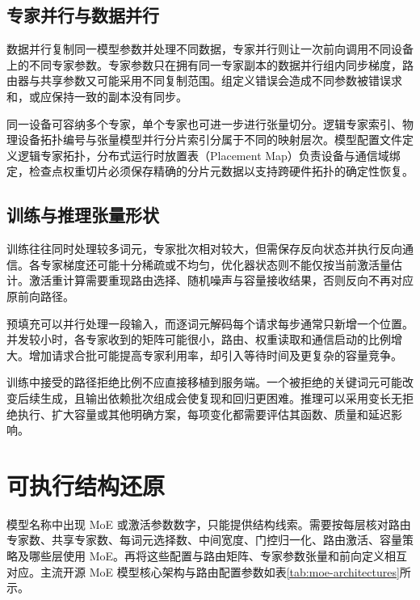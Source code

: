 \documentclass[../textbook.tex]{subfiles}
\begin{document}
\subsection{专家并行与数据并行}
数据并行复制同一模型参数并处理不同数据，专家并行则让一次前向调用不同设备上的不同专家参数。专家参数只在拥有同一专家副本的数据并行组内同步梯度，路由器与共享参数又可能采用不同复制范围。组定义错误会造成不同参数被错误求和，或应保持一致的副本没有同步。

同一设备可容纳多个专家，单个专家也可进一步进行张量切分。逻辑专家索引、物理设备拓扑编号与张量模型并行分片索引分属于不同的映射层次。模型配置文件定义逻辑专家拓扑，分布式运行时放置表（Placement Map）负责设备与通信域绑定，检查点权重切片必须保存精确的分片元数据以支持跨硬件拓扑的确定性恢复。

\subsection{训练与推理张量形状}
训练往往同时处理较多词元，专家批次相对较大，但需保存反向状态并执行反向通信。各专家梯度还可能十分稀疏或不均匀，优化器状态则不能仅按当前激活量估计。激活重计算需要重现路由选择、随机噪声与容量接收结果，否则反向不再对应原前向路径。

预填充可以并行处理一段输入，而逐词元解码每个请求每步通常只新增一个位置。并发较小时，各专家收到的矩阵可能很小，路由、权重读取和通信启动的比例增大。增加请求合批可能提高专家利用率，却引入等待时间及更复杂的容量竞争。

训练中接受的路径拒绝比例不应直接移植到服务端。一个被拒绝的关键词元可能改变后续生成，且输出依赖批次组成会使复现和回归更困难。推理可以采用变长无拒绝执行、扩大容量或其他明确方案，每项变化都需要评估其函数、质量和延迟影响。

\section{可执行结构还原}

模型名称中出现 MoE 或激活参数数字，只能提供结构线索。需要按每层核对路由专家数、共享专家数、每词元选择数、中间宽度、门控归一化、路由激活、容量策略及哪些层使用 MoE。再将这些配置与路由矩阵、专家参数张量和前向定义相互对应。主流开源 MoE 模型核心架构与路由配置参数如表\ref{tab:moe-architectures}所示。
\end{document}
